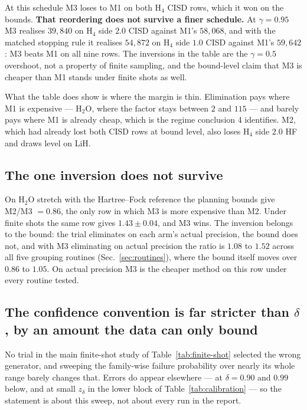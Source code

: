 \documentclass[10pt]{article}
\begin{document}
At this schedule M3 loses to M1 on both H$_4$ CISD rows, which it won on the
bounds. \textbf{That reordering does not survive a finer schedule.} At
$\gamma=0.95$ M3 realises $39{,}840$ on H$_4$ side $2.0$ CISD against M1's
$58{,}068$, and with the matched stopping rule it realises $54{,}872$ on H$_4$
side $1.0$ CISD against M1's $59{,}642$: M3 beats M1 on all nine rows. The
inversions in the table are the $\gamma=0.5$ overshoot, not a property of finite
sampling, and the bound-level claim that M3 is cheaper than M1 stands under finite
shots as well.

What the table does show is where the margin is thin. Elimination pays where M1 is
expensive --- H$_2$O, where the factor stays between $2$ and $115$ --- and barely
pays where M1 is already cheap, which is the regime conclusion 4 identifies. M2,
which had already lost both CISD rows at bound level, also loses H$_4$ side $2.0$
HF and draws level on LiH.

\subsection{The one inversion does not survive}

On H$_2$O stretch with the Hartree--Fock reference the planning bounds give
M2/M3 $=0.86$, the only row in which M3 is more expensive than M2. Under finite
shots the same row gives $1.43\pm0.04$, and M3 wins. The inversion belongs to the
bound: the trial eliminates on each arm's actual precision, the bound does not,
and with M3 eliminating on actual precision the ratio is $1.08$ to $1.52$ across
all five grouping routines (Sec.~\ref{sec:routines}), where the bound itself moves
over $0.86$ to $1.05$. On actual precision M3 is the cheaper method on this row
under every routine tested.

\subsection{The confidence convention is far stricter than $\delta$, by an amount the data can only bound}
\label{sec:calibration}

No trial in the main finite-shot study of Table~\ref{tab:finite-shot} selected the
wrong generator, and sweeping the family-wise failure probability over nearly its
whole range barely changes that. Errors do appear elsewhere --- at $\delta=0.90$
and $0.99$ below, and at small $z_\delta$ in the lower block of Table~\ref{tab:calibration} --- so
the statement is about this sweep, not about every run in the report.
\end{document}
